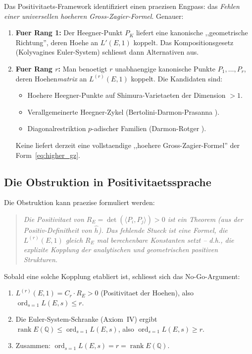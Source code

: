 \documentclass[aps,prd,twocolumn,superscriptaddress,nofootinbib]{revtex4-2}
\theoremstyle{definition}
\theoremstyle{remark}
\DeclareMathOperator{\ord}{ord}
\DeclareMathOperator{\rank}{rank}
\begin{document}
Das Positivitaets-Framework identifiziert einen praezisen Engpass: das \textit{Fehlen einer universellen hoeheren Gross-Zagier-Formel}. Genauer:

\begin{enumerate}
\item \textbf{Fuer Rang 1:} Der Heegner-Punkt $P_K$ liefert eine kanonische ,,geometrische Richtung'', deren Hoehe an $L'(E,1)$ koppelt. Das Kompositionsgesetz (Kolyvagines Euler-System) schliesst dann Alternativen aus.

\item \textbf{Fuer Rang $r$:} Man benoetigt $r$ unabhaengige kanonische Punkte $P_1, \ldots, P_r$, deren Hoehen\textit{matrix} an $L^{(r)}(E,1)$ koppelt. Die Kandidaten sind:
\begin{itemize}
\item Hoehere Heegner-Punkte auf Shimura-Varietaeten der Dimension $> 1$.
\item Verallgemeinerte Heegner-Zykel (Bertolini-Darmon-Prasanna \cite{BDP2013}).
\item Diagonalrestriktion $p$-adischer Familien (Darmon-Rotger \cite{DarmonRotger2017}).
\end{itemize}
Keine liefert derzeit eine vollstaendige ,,hoehere Gross-Zagier-Formel'' der Form~\eqref{eq:higher_gz}.
\end{enumerate}

\subsection{Die Obstruktion in Positivitaetssprache}

Die Obstruktion kann praezise formuliert werden:

\begin{quote}
\textit{Die Positivitaet von $R_E = \det(\langle P_i, P_j \rangle) > 0$ ist ein Theorem (aus der Positiv-Definitheit von $\hat{h}$). Das fehlende Stueck ist eine Formel, die $L^{(r)}(E,1)$ gleich $R_E$ mal berechenbare Konstanten setzt -- d.h., die explizite Kopplung der analytischen und geometrischen positiven Strukturen.}
\end{quote}

Sobald eine solche Kopplung etabliert ist, schliesst sich das No-Go-Argument:
\begin{enumerate}
\item $L^{(r)}(E,1) = C_r \cdot R_E > 0$ (Positivitaet der Hoehen), also $\ord_{s=1} L(E,s) \leq r$.
\item Die Euler-System-Schranke (Axiom~IV) ergibt $\rank E(\mathbb{Q}) \leq \ord_{s=1} L(E,s)$, also $\ord_{s=1} L(E,s) \geq r$.
\item Zusammen: $\ord_{s=1} L(E,s) = r = \rank E(\mathbb{Q})$.
\end{enumerate}
\end{document}
